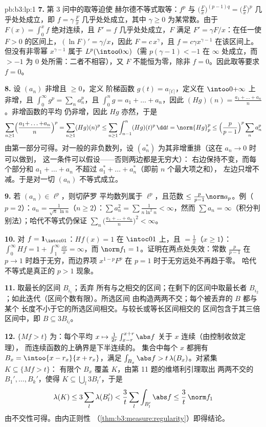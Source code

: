 \begin{solution}{pb:b3:lp:1}
\textbf{7.} 第 3 问中的取等迫使
赫尔德不等式取等：$f^p$ 与 $\bigl(\frac Fx\bigr)^{(p-1)q}
= \bigl(\frac Fx\bigr)^p$ 几乎处处成立，即 $f = \gamma\,\frac Fx$
几乎处处成立，其中 $\gamma \geq 0$ 为某常数。由于 $F(x) = \int_0^xf$
绝对连续，且 $F' = f$ 几乎处处成立，$F$ 满足 $F' =
\gamma F/x$：在任一使 $F > 0$ 的区间上，$(\ln F)' =
\gamma/x$，因此 $F = c\,x^{\gamma}$，且 $f = c\gamma
x^{\gamma - 1}$ 在该区间上。但没有非零幂 $x^{\gamma-1}$
属于 $L^p(\intoo0\infty)$（需 $p(\gamma - 1) < -1$
在 $\infty$ 处成立，而 $> -1$ 为 $0$ 处所需：二者不相容），又 $F$
不能恒为零，除非 $f = 0$。因此取等要求 $f =
0$。

\textbf{8.} 设 $(a_n)$ 非增且 $\geq 0$，定义
阶梯函数 $g(t) = a_{\lceil t\rceil}$，定义在
$\intoo0{+\infty}$ 上非增，且 $\int_0^\infty g^p =
\sum_na_n^p$，且 $\int_0^ng = a_1 + \dots + a_n$，因此
$(Hg)(n) = \frac{a_1 + \dots + a_n}n$。非增函数的平均
仍非增，因此 $Hg$ 亦然，于是
\[
\sum_{n\geq1}\Bigl(\frac{a_1{+}\dots{+}a_n}n\Bigr)^p
= \sum_{n\geq1}(Hg)(n)^p
\leq \sum_{n\geq1}\int_{n-1}^n (Hg)(t)^p\,\dd t
= \norm{Hg}_p^p
\leq \Bigl(\frac p{p-1}\Bigr)^p\sum_n a_n^p
\]
由第一部分可得。对一般的非负数列，设 $(a_n^*)$
为其非增重排（这在 $a_n \to 0$ 时可以做到，
这一条件可以假设——否则两边都是无穷大）：
右边保持不变，而每个部分和 $a_1 + \dots
+ a_n$ 不超过 $a_1^* + \dots + a_n^*$（即前 $n$ 个最大项之和），
左边只增不减。于是对一切
$(a_n)$ 不等式成立。

\textbf{9.} 若 $(a_n) \in \ell^p$，则切萨罗
平均数列属于 $\ell^p$，且范数 $\leq \frac p{p-1}\norm
a_p$。例（$p = 2$）：$a_n = \frac1{\sqrt n\,\ln n}$（$n
\geq 2$）：$\sum a_n^2 = \sum\frac1{n\ln^2n} < \infty$，然而
$\sum a_n = \infty$（积分判别法）；哈代不等式仍保证
$\sum_n\bigl(\frac{a_1 + \dots + a_n}n\bigr)^2 < \infty$。

\textbf{10.} 对 $f = \mathbf 1_{\intcc01}$：$Hf(x) = 1$ 在
$\intoc01$ 上，且 $= \frac1x$（$x \geq 1$）：$\int_0^\infty Hf =
1 + \int_1^\infty\frac{\dd x}x = \infty$，而 $\norm f_1 =
1$。证明在两点处失效：常数
$\frac p{p-1}$ 在 $p \to 1$ 时趋于无穷，而边界项
$x^{1-p}F^p$ 在 $p = 1$ 时于无穷远处不再趋于零。
哈代不等式是真正的 $p > 1$ 现象。

\textbf{11.} 取最长的区间 $B_{i_1}$；丢弃
所有与之相交的区间；在剩下的区间中取最长者
$B_{i_2}$；如此迭代（区间个数有限）。所选区间
由构造两两不交；每个被丢弃的 $B$ 都与某个
长度不小于它的所选区间相交。与较长或等长区间相交的
区间包含于其三倍区间中，即 $B \subseteq
3B_{i_l}$。

\textbf{12.} $\{Mf > t\}$ 为：每个平均 $x \mapsto
\frac1{2r}\int_{x-r}^{x+r}\abs f$ 关于 $x$ 连续（由控制收敛定理），
而连续函数的上确界是下半连续的。
集合中每个 $x$ 都拥有 $B_x =
\intoo{x-r_x}{x+r_x}$，满足 $\int_{B_x}\abs f >
t\,\lambda(B_x)$。对紧集 $K \subseteq \{Mf > t\}$：
有限个 $B_x$ 覆盖 $K$，由第 11 题的维塔利引理取出
两两不交的 $B_1', \dots, B_k'$，使得 $K \subseteq
\bigcup_l3B_l'$，于是
\[
\lambda(K) \leq 3\sum_l\lambda(B_l') <
\frac3t\sum_l\int_{B_l'}\abs f \leq \frac3t\,\norm f_1
\]
由不交性可得。由内正则性
（\cref{thm:b3:measure:regularity}）即得结论。


\end{solution}
